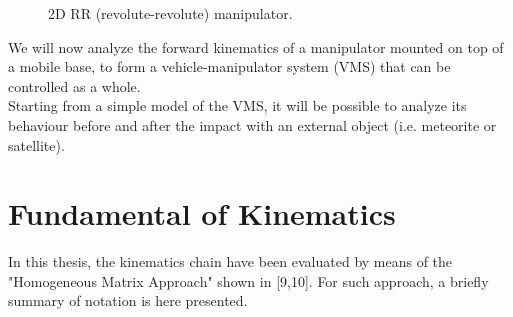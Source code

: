 \documentclass[a4paper,12pt,oneside]{report}
\begin{document}
\begin{figure}[!]
  \centering
  
  \caption{2D RR (revolute-revolute) manipulator.}
  \label{end_defector}
\end{figure}
We will now analyze the forward kinematics of a manipulator mounted on top of a mobile base, to form a vehicle-manipulator system (VMS) that can be controlled as a whole.\\
Starting from a simple model of the VMS, it will be possible to analyze its behaviour before and after the impact with an external object (i.e. meteorite or satellite).
\newpage
\section{Fundamental of Kinematics}\label{Homogeneous}
In this thesis, the kinematics chain have been evaluated by means of the "Homogeneous Matrix Approach" shown in [9,10]. For such approach, a briefly summary of notation is here presented.
\end{document}
